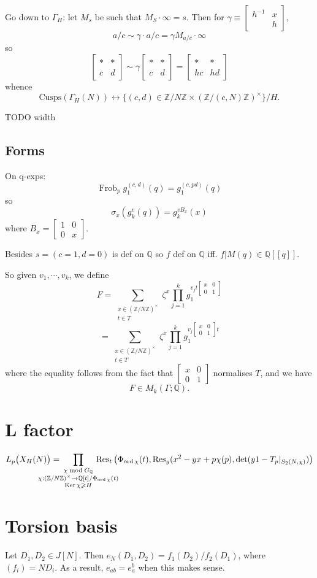 \documentclass[12pt]{article}
\newcommand{\Z}{\mathbb{Z}}
\newcommand{\Q}{\mathbb{Q}}
\newcommand{\Ker}{\operatorname{Ker}}
\newcommand{\Res}{\operatorname{Res}}
\newcommand{\ord}{\operatorname{ord}}
\newcommand{\Frob}{\operatorname{Frob}}
\newcommand{\smat}[4]{\left[ \begin{smallmatrix} #1 & #2 \\ #3 & #4 \end{smallmatrix} \right]}
\theoremstyle{definition}
\begin{document}
Go down to $\Gamma_H$: let $M_s$ be such that $M_S \cdot \infty = s$. Then for $\gamma \equiv \smat{h^{-1}}{x}{}{h}$,
\[ a/c \sim \gamma \cdot a/c = \gamma M_{a/c} \cdot \infty \]
so
\[ \smat{*}{*}{c}{d} \sim \gamma \smat{*}{*}{c}{d} = \smat{*}{*}{hc}{hd} \]
whence
\[ \text{Cusps}(\Gamma_H(N)) \longleftrightarrow \{ (c,d) \in \Z/N\Z \times (\Z/(c,N)\Z)^\times \} / H. \]

TODO width

\subsection{Forms}

On  q-exps:
\[ \Frob_p g_1^{(c,d)}(q) = g_1^{(c,pd)}(q) \]
so
\[ \sigma_x (g_k^v (q) )= g_k^{v B_x} (x) \]
where $B_x = \smat{1}{0}{0}{x}$.
 
Besides $s=(c=1,d=0)$ is def on $\Q$ so $f$ def on $\Q$ iff. $f \vert M (q) \in \Q[[q]]$.

So given $v_1,\cdots,v_k$, we define
\[ F = \sum_{\substack{x \in (\Z/N\Z)^\times \\ t \in T}} \zeta^x \prod_{j=1}^k g_1^{v_j t \smat{x}{0}{0}{1} } \]
\[ = \sum_{\substack{x \in (\Z/N\Z)^\times \\ t \in T}} \zeta^x \prod_{j=1}^k g_1^{v_j  \smat{x}{0}{0}{1} t} \]
where the equality follows from the fact that  $\smat{x}{0}{0}{1}$ normalises $T$, and we have
\[ F \in M_k(\Gamma;\Q). \]

\section{L factor}

\[ L_p\big(X_H(N)\big) = \hspace{-1cm} \prod_{\substack{\chi \bmod G_\Q \\ \chi : (\Z/N\Z)^\times \rightarrow \Q[t]/\Phi_{\ord \chi}(t) \\ \Ker \chi \geqslant H}} \hspace{-1cm} \Res_t\big( \Phi_{\ord \chi}(t),\Res_y(x^2-yx+p\chi(p), \det(y1-T_p \vert_{S_2(N,\chi)}) \big) \]

\section{Torsion basis}

Let $D_1, D_2 \in J[N]$. Then $e_N(D_1,D_2) = f_1(D_2)/f_2(D_1)$, where $(f_i) = N D_i$. As a result, $e_{ab} = e_a^b$ when this makes sense.
\end{document}
